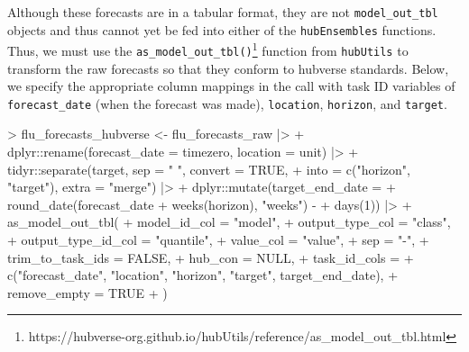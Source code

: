 \documentclass[
]{article}
\newenvironment{Shaded}{\begin{snugshade}}{\end{snugshade}}
\newcommand{\AttributeTok}[1]{\textcolor[rgb]{0.40,0.45,0.13}{#1}}
\newcommand{\ConstantTok}[1]{\textcolor[rgb]{0.56,0.35,0.01}{#1}}
\newcommand{\DecValTok}[1]{\textcolor[rgb]{0.68,0.00,0.00}{#1}}
\newcommand{\FunctionTok}[1]{\textcolor[rgb]{0.28,0.35,0.67}{#1}}
\newcommand{\NormalTok}[1]{\textcolor[rgb]{0.00,0.23,0.31}{#1}}
\newcommand{\OtherTok}[1]{\textcolor[rgb]{0.00,0.23,0.31}{#1}}
\newcommand{\SpecialCharTok}[1]{\textcolor[rgb]{0.37,0.37,0.37}{#1}}
\newcommand{\StringTok}[1]{\textcolor[rgb]{0.13,0.47,0.30}{#1}}
\begin{document}
Although these forecasts are in a tabular format, they are not
\texttt{model\_out\_tbl} objects and thus cannot yet be fed into either
of the \texttt{hubEnsembles} functions. Thus, we must use the
\texttt{as\_model\_out\_tbl()}\footnote{https://hubverse-org.github.io/hubUtils/reference/as\_model\_out\_tbl.html}
function from \texttt{hubUtils} to transform the raw forecasts so that
they conform to hubverse standards. Below, we specify the appropriate
column mappings in the call with task ID variables of
\texttt{forecast\_date} (when the forecast was made), \texttt{location},
\texttt{horizon}, and \texttt{target}.

\begin{Shaded}
\begin{Highlighting}[]
\SpecialCharTok{\textgreater{}}\NormalTok{ flu\_forecasts\_hubverse }\OtherTok{\textless{}{-}}\NormalTok{ flu\_forecasts\_raw }\SpecialCharTok{|\textgreater{}}
\SpecialCharTok{+}\NormalTok{   dplyr}\SpecialCharTok{::}\FunctionTok{rename}\NormalTok{(}\AttributeTok{forecast\_date =}\NormalTok{ timezero, }\AttributeTok{location =}\NormalTok{ unit) }\SpecialCharTok{|\textgreater{}}
\SpecialCharTok{+}\NormalTok{   tidyr}\SpecialCharTok{::}\FunctionTok{separate}\NormalTok{(target, }\AttributeTok{sep =} \StringTok{" "}\NormalTok{, }\AttributeTok{convert =} \ConstantTok{TRUE}\NormalTok{,}
\SpecialCharTok{+}                   \AttributeTok{into =} \FunctionTok{c}\NormalTok{(}\StringTok{"horizon"}\NormalTok{, }\StringTok{"target"}\NormalTok{), }\AttributeTok{extra =} \StringTok{"merge"}\NormalTok{) }\SpecialCharTok{|\textgreater{}}
\SpecialCharTok{+}\NormalTok{   dplyr}\SpecialCharTok{::}\FunctionTok{mutate}\NormalTok{(}\AttributeTok{target\_end\_date =} 
\SpecialCharTok{+}                   \FunctionTok{round\_date}\NormalTok{(forecast\_date }\SpecialCharTok{+} \FunctionTok{weeks}\NormalTok{(horizon), }\StringTok{"weeks"}\NormalTok{) }\SpecialCharTok{{-}}
\SpecialCharTok{+}                     \FunctionTok{days}\NormalTok{(}\DecValTok{1}\NormalTok{)) }\SpecialCharTok{|\textgreater{}}
\SpecialCharTok{+}   \FunctionTok{as\_model\_out\_tbl}\NormalTok{(}
\SpecialCharTok{+}     \AttributeTok{model\_id\_col =} \StringTok{"model"}\NormalTok{,}
\SpecialCharTok{+}     \AttributeTok{output\_type\_col =} \StringTok{"class"}\NormalTok{,}
\SpecialCharTok{+}     \AttributeTok{output\_type\_id\_col =} \StringTok{"quantile"}\NormalTok{,}
\SpecialCharTok{+}     \AttributeTok{value\_col =} \StringTok{"value"}\NormalTok{,}
\SpecialCharTok{+}     \AttributeTok{sep =} \StringTok{"{-}"}\NormalTok{,}
\SpecialCharTok{+}     \AttributeTok{trim\_to\_task\_ids =} \ConstantTok{FALSE}\NormalTok{,}
\SpecialCharTok{+}     \AttributeTok{hub\_con =} \ConstantTok{NULL}\NormalTok{,}
\SpecialCharTok{+}     \AttributeTok{task\_id\_cols =} 
\SpecialCharTok{+}       \FunctionTok{c}\NormalTok{(}\StringTok{"forecast\_date"}\NormalTok{, }\StringTok{"location"}\NormalTok{, }\StringTok{"horizon"}\NormalTok{, }\StringTok{"target"}\NormalTok{, target\_end\_date),}
\SpecialCharTok{+}     \AttributeTok{remove\_empty =} \ConstantTok{TRUE}
\SpecialCharTok{+}\NormalTok{   )}
\end{Highlighting}
\end{Shaded}
\end{document}
